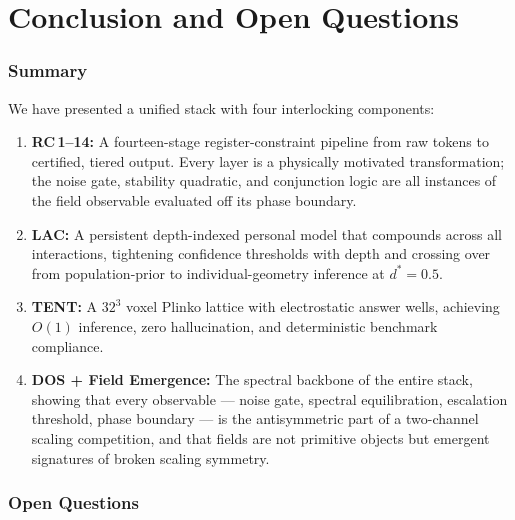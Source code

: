 \documentclass[11pt,twoside]{article}
\theoremstyle{plain}
\theoremstyle{definition}
\theoremstyle{remark}
\begin{document}
\part{Conclusion and Open Questions}

\section{Summary}

We have presented a unified stack with four interlocking components:
\begin{enumerate}
\item \textbf{RC\,1--14:} A fourteen-stage register-constraint pipeline from
  raw tokens to certified, tiered output.  Every layer is a physically
  motivated transformation; the noise gate, stability quadratic, and
  conjunction logic are all instances of the field observable evaluated off
  its phase boundary.
\item \textbf{LAC:} A persistent depth-indexed personal model that compounds
  across all interactions, tightening confidence thresholds with depth and
  crossing over from population-prior to individual-geometry inference at
  $d^*=0.5$.
\item \textbf{TENT:} A $32^3$ voxel Plinko lattice with electrostatic answer
  wells, achieving $O(1)$ inference, zero hallucination, and deterministic
  benchmark compliance.
\item \textbf{DOS + Field Emergence:} The spectral backbone of the entire
  stack, showing that every observable --- noise gate, spectral equilibration,
  escalation threshold, phase boundary --- is the antisymmetric part of a
  two-channel scaling competition, and that fields are not primitive objects
  but emergent signatures of broken scaling symmetry.
\end{enumerate}

\section{Open Questions}
\end{document}
